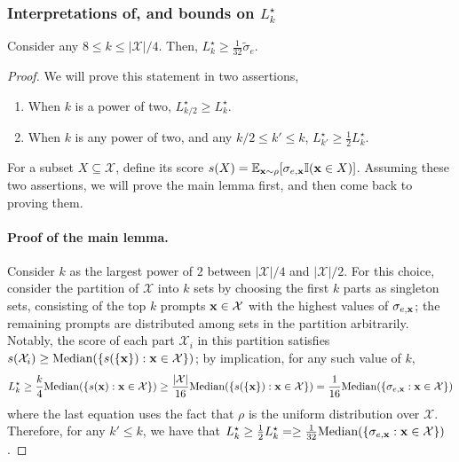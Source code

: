 \subsubsection{Interpretations of, and bounds on \texorpdfstring{$L_k^\star$}{}}
\begin{lemma}
Consider any $8 \le k \le |\mathcal{X}|/4$. Then, $L_k^\star \ge \frac{1}{32} \widetilde{\sigma}_e$.
\end{lemma}
\begin{proof}
We will prove this statement in two assertions,
\begin{enumerate}
    \item When $k$ is a power of two, $L_{k/2}^\star \ge L_k^\star$.
    \item When $k$ is any power of two, and any $k/2 \le k' \le k$, $L_{k'}^\star \ge \frac{1}{2} L_{k}^\star$.
\end{enumerate}
For a subset $X \subseteq \mathcal{X}$, define its score $s(X) = \mathbb{E}_{\mathbf{x} \sim \rho} [ \sigma_{e,\mathbf{x}} \mathbb{I} (\mathbf{x} \in X)]$. Assuming these two assertions, we will prove the main lemma first, and then come back to proving them.

\paragraph{Proof of the main lemma.} Consider $k$ as the largest power of $2$ between $|\mathcal{X}|/4$ and $|\mathcal{X}|/2$. For this choice, consider the partition of $\mathcal{X}$ into $k$ sets by choosing the first $k$ parts as singleton sets, consisting of the top $k$ prompts $\mathbf{x} \in \mathcal{X}$ with the highest values of $\sigma_{e,\mathbf{x}}$; the remaining prompts are distributed among sets in the partition arbitrarily. Notably, the score of each part $\mathcal{X}_i$ in this partition satisfies $s(\mathcal{X}_i) \ge \text{Median} ( \{ s( \{\mathbf{x}\} ) : \mathbf{x} \in \mathcal{X} \} )$; by implication, for any such value of $k$, 
\begin{align} \label{eq:median}
L_k^\star \ge \frac{k}{4} \text{Median} ( \{ s(\mathbf{x}) : \mathbf{x} \in \mathcal{X} \} ) \ge \frac{|\mathcal{X}|}{16} \text{Median} ( \{ s( \{ \mathbf{x} \} ) : \mathbf{x} \in \mathcal{X} \} ) = \frac{1}{16} \text{Median} ( \{ \sigma_{e,\mathbf{x}} : \mathbf{x} \in \mathcal{X} \} )
\end{align}
where the last equation uses the fact that $\rho$ is the uniform distribution over $\mathcal{X}$. Therefore, for any $k' \le k$, we have that $L_k^\star \ge \frac{1}{2} L_k^\star = \ge \frac{1}{32} \text{Median} ( \{ \sigma_{e,\mathbf{x}} : \mathbf{x} \in \mathcal{X} \} )$.


\end{proof}
